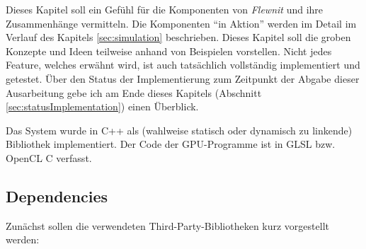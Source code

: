 
\label{sec:systemArchitecture}

Dieses Kapitel soll ein Gefühl für die Komponenten von \emph{Flewnit} und 
ihre Zusammenhänge vermitteln. Die Komponenten "`in Aktion"' werden im Detail im Verlauf des Kapitels 
\ref{sec:simulation} beschrieben.
Dieses Kapitel soll die groben Konzepte und Ideen teilweise anhand von Beispielen vorstellen.
Nicht jedes Feature, welches erwähnt wird, ist auch tatsächlich vollständig implementiert und getestet.
Über den Status der Implementierung zum Zeitpunkt der Abgabe dieser Ausarbeitung
gebe ich am Ende dieses Kapitels (Abschnitt \ref{sec:statusImplementation}) einen Überblick.

Das System wurde in C++ als (wahlweise statisch oder dynamisch zu linkende) Bibliothek implementiert.
Der Code der GPU-Programme ist in GLSL bzw. OpenCL C verfasst.

\subsection{Dependencies}
	\label{sec:dependencies}
	
	Zunächst sollen die verwendeten Third-Party-Bibliotheken kurz vorgestellt werden:

